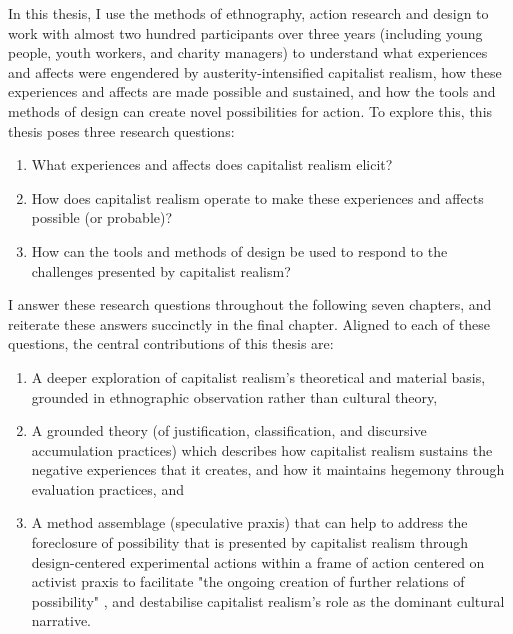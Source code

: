 In this thesis, I use the methods of ethnography, action research and design to work with almost two hundred participants over three years (including young people, youth workers, and charity managers) to understand what experiences and affects were engendered by austerity-intensified capitalist realism, how these experiences and affects are made possible and sustained, and how the tools and methods of design can create novel possibilities for action. To explore this, this thesis poses three research questions: 
\begin{enumerate}
    \item What experiences and affects does capitalist realism elicit?
    \item How does capitalist realism operate to make these experiences and affects possible (or probable)?
    \item How can the tools and methods of design be used to respond to the challenges presented by capitalist realism?
\end{enumerate}
I answer these research questions throughout the following seven chapters, and reiterate these answers succinctly in the final chapter. Aligned to each of these questions, the central contributions of this thesis are:
\begin{enumerate}
    \item A deeper exploration of capitalist realism's theoretical and material basis, grounded in ethnographic observation rather than cultural theory,
    \item A grounded theory (of justification, classification, and discursive accumulation practices) which describes how capitalist realism sustains the negative experiences that it creates, and how it maintains hegemony through evaluation practices, and
    \item A method assemblage (speculative praxis) that can help to address the foreclosure of possibility that is presented by capitalist realism through design-centered experimental actions within a frame of action centered on activist praxis to facilitate "the ongoing creation of further relations of possibility" \citep[p. 320]{harrison_future_2020}, and destabilise capitalist realism's role as the dominant cultural narrative. 
\end{enumerate}

